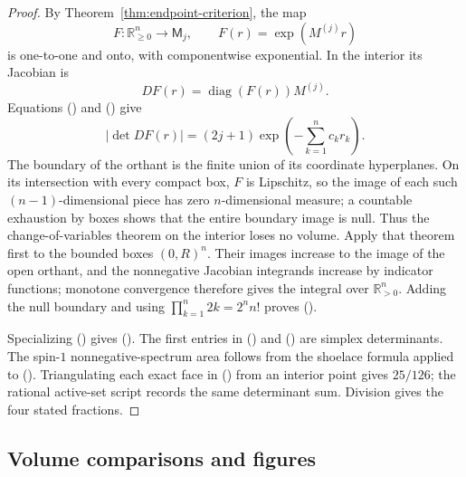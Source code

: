 \documentclass[twoside,10pt]{article}
\numberwithin{equation}{section}
\theoremstyle{slbody}
\theoremstyle{definition}
\theoremstyle{remark}
\renewcommand{\eqref}[1]{%
  \textup{{\normalfont(\oldstylenums{\ref{#1}}}\normalfont)}}
\begin{document}
\begin{proof}
By Theorem~\ref{thm:endpoint-criterion}, the map
\begin{equation*}
 F:\mathbb R_{\geq0}^n\longrightarrow\mathsf M_j,\qquad
 F(r)=\exp(M^{(j)}r)
\end{equation*}
is one-to-one and onto, with componentwise exponential.  In the
interior its Jacobian is
\begin{equation*}
 DF(r)=\operatorname{diag}(F(r))M^{(j)}.
\end{equation*}
Equations \eqref{eq:M-determinant-magnitude} and
\eqref{eq:column-decays} give
\begin{equation*}
 |\det DF(r)|
 =(2j+1)\exp\left(-\sum_{k=1}^nc_kr_k\right).
\end{equation*}
The boundary of the orthant is the finite union of its coordinate
hyperplanes.  On its intersection with every compact box, \(F\) is
Lipschitz, so the image of each such \((n-1)\)-dimensional piece has
zero \(n\)-dimensional measure; a countable exhaustion by boxes shows
that the entire boundary image is null.  Thus the
change-of-variables theorem on the interior loses no volume.  Apply that
theorem first to the bounded boxes \((0,R)^n\).  Their images increase to
the image of the open orthant, and the nonnegative Jacobian integrands
increase by indicator functions; monotone convergence therefore gives
the integral over \(\mathbb R_{>0}^n\).  Adding the null boundary and using
\(\prod_{k=1}^n2k=2^n n!\) proves
\eqref{eq:general-embeddable-volume}.

Specializing \eqref{eq:column-decays} gives
\eqref{eq:low-spin-embeddable-volumes}.  The first entries in
\eqref{eq:spin-one-comparison-volumes} and
\eqref{eq:spin-three-comparison-volumes} are simplex determinants.
The spin-\(1\) nonnegative-spectrum area follows from the shoelace
formula applied
to \eqref{eq:spin-one-positive-polytope}.  Triangulating each exact
face in \eqref{eq:spin-three-positive-polytope} from an interior point
gives \(25/126\); the rational active-set script records the same
determinant sum.  Division gives the four stated fractions.
\end{proof}

\subsection{Volume comparisons and figures}
\end{document}
